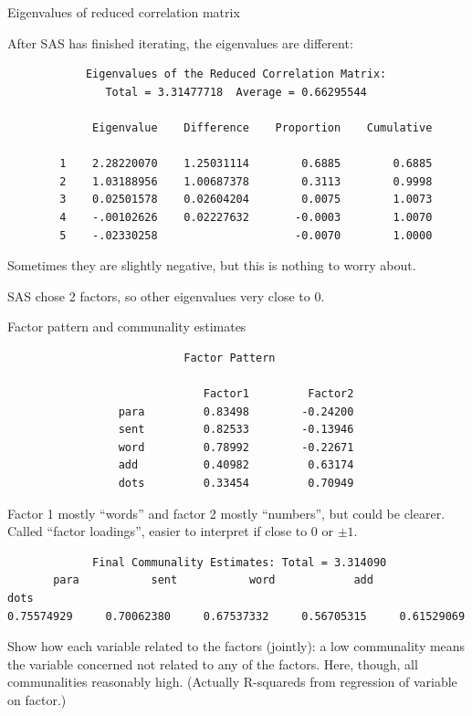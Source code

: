 \documentclass[pdf]{prosper}
\begin{document}
\begin{slide}{Eigenvalues of reduced correlation matrix}

After SAS has finished iterating, the eigenvalues are different:

{\scriptsize
\begin{verbatim}
            Eigenvalues of the Reduced Correlation Matrix:
               Total = 3.31477718  Average = 0.66295544
 
             Eigenvalue    Difference    Proportion    Cumulative

        1    2.28220070    1.25031114        0.6885        0.6885
        2    1.03188956    1.00687378        0.3113        0.9998
        3    0.02501578    0.02604204        0.0075        1.0073
        4    -.00102626    0.02227632       -0.0003        1.0070
        5    -.02330258                     -0.0070        1.0000

\end{verbatim}
}

Sometimes they are slightly negative, but this is nothing to worry about. 

\vspace{2ex}

SAS chose 2 factors, so other eigenvalues very close to 0.

  
\end{slide}

\begin{slide}{Factor pattern and communality estimates}

{\scriptsize
\begin{verbatim}
                           Factor Pattern
 
                              Factor1         Factor2
                 para         0.83498        -0.24200
                 sent         0.82533        -0.13946
                 word         0.78992        -0.22671
                 add          0.40982         0.63174
                 dots         0.33454         0.70949
\end{verbatim}
}

Factor 1 mostly ``words'' and factor 2 mostly ``numbers'', but could be clearer. Called ``factor loadings'', easier to interpret if close to 0 or $\pm 1$.

{\scriptsize
\begin{verbatim}
             Final Communality Estimates: Total = 3.314090
       para           sent           word            add           dots
0.75574929     0.70062380     0.67537332     0.56705315     0.61529069
\end{verbatim}
}

Show how each variable related to the factors (jointly): a low communality means the variable concerned not related to any of the factors. Here, though, all communalities reasonably high. (Actually R-squareds from regression of variable on factor.)
  
\end{slide}
\end{document}
